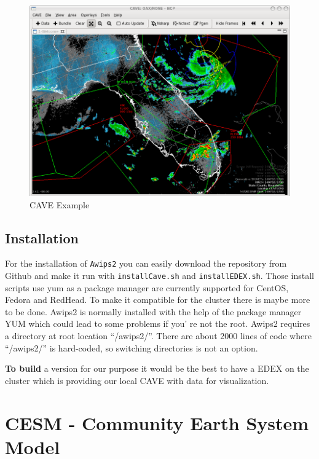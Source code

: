 \documentclass[]{article}
\begin{document}
\begin{figure}[htbp]
\centering
\includegraphics{pics/Unidata_AWIPS2_CAVE.png}
\caption{CAVE Example}
\end{figure}

\subsection{Installation}\label{installation}

For the installation of \texttt{Awips2} you can easily download the
repository from Github and make it run with \texttt{installCave.sh} and
\texttt{installEDEX.sh}. Those install scripts use yum as a package
manager are currently supported for CentOS, Fedora and RedHead. To make
it compatible for the cluster there is maybe more to be done. Awips2 is
normally installed with the help of the package manager YUM which could
lead to some problems if you' re not the root. Awips2 requires a
directory at root location ``/awips2/''. There are about 2000 lines of
code where ``/awips2/'' is hard-coded, so switching directories is not
an option.

\textbf{To build} a version for our purpose it would be the best to have
a EDEX on the cluster which is providing our local CAVE with data for
visualization.

\pagebreak

\section{CESM - Community Earth System
Model}\label{cesm---community-earth-system-model}
\end{document}

